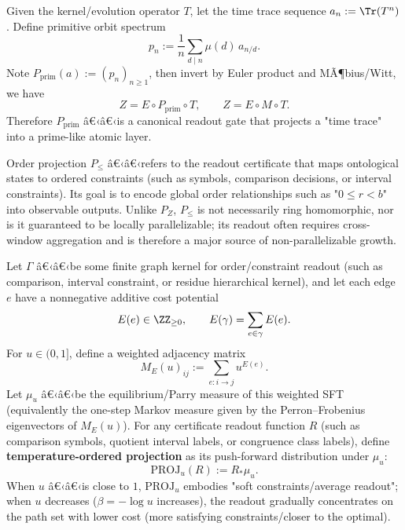 \begin{definition}\label{def:pom-proj-prim}
Given the kernel/evolution operator $T$, let the time trace sequence $a_n:=\Tr(T^n)$. Define primitive orbit spectrum
\[
p_n:=\frac{1}{n}\sum_{d\mid n}\mu(d)\,a_{n/d}.
\]
Note $P_{\mathrm{prim}}(a):=(p_n)_{n\ge 1}$, then invert by Euler product and MÃ¶bius/Witt, we have
\[
Z=E\circ P_{\mathrm{prim}}\circ T,
\qquad
Z=E\circ M\circ T.
\]
Therefore $P_{\mathrm{prim}}$ â€‹â€‹is a canonical readout gate that projects a "time trace" into a prime-like atomic layer.
\end{definition}

\begin{definition}\label{def:pom-proj-order}
Order projection $P_{\le}$ â€‹â€‹refers to the readout certificate that maps ontological states to ordered constraints (such as symbols, comparison decisions, or interval constraints). Its goal is to encode global order relationships such as "$0\le r<b$" into observable outputs. Unlike $P_Z$, $P_{\le}$ is not necessarily ring homomorphic, nor is it guaranteed to be locally parallelizable; its readout often requires cross-window aggregation and is therefore a major source of non-parallelizable growth.
\end{definition}

\begin{definition}\label{def:pom-proj-temp}
Let $\Gamma$ â€‹â€‹be some finite graph kernel for order/constraint readout (such as comparison, interval constraint, or residue hierarchical kernel), and let each edge $e$ have a nonnegative additive cost potential
\[
E(e)\in\ZZ_{\ge 0},
\qquad
E(\gamma)=\sum_{e\in\gamma}E(e).
\]
For $u\in(0,1]$, define a weighted adjacency matrix
\[
M_E(u)_{ij}:=\sum_{e:i\to j}u^{E(e)}.
\]
Let $\mu_u$ â€‹â€‹be the equilibrium/Parry measure of this weighted SFT (equivalently the one-step Markov measure given by the Perron--Frobenius eigenvectors of $M_E(u)$). For any certificate readout function $R$ (such as comparison symbols, quotient interval labels, or congruence class labels), define \textbf{temperature-ordered projection} as its push-forward distribution under $\mu_u$:
\[
\mathrm{PROJ}_u(R):=R_\ast\mu_u.
\]
When $u$ â€‹â€‹is close to $1$, $\mathrm{PROJ}_u$ embodies "soft constraints/average readout"; when $u$ decreases ($\beta=-\log u$ increases), the readout gradually concentrates on the path set with lower cost (more satisfying constraints/closer to the optimal).
\end{definition}

